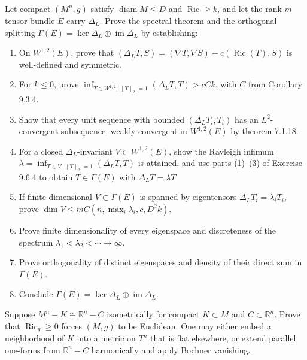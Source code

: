 \begin{remark}
  \label{rem:pet-ch9-exercise-9-6-5}
  Let compact $(M^n,g)$ satisfy $\operatorname{diam}M\le D$ and
  $\operatorname{Ric}\ge k$, and let the rank-$m$ tensor bundle $E$ carry
  $\Delta_L$.  Prove the spectral theorem and the orthogonal splitting
  $\Gamma(E)=\ker\Delta_L\oplus\operatorname{im}\Delta_L$ by establishing:
  \begin{enumerate}
    \item[(1)] On $W^{1,2}(E)$, prove that
      $(\Delta_LT,S)=(\nabla T,\nabla S)+c(\operatorname{Ric}(T),S)$ is
      well-defined and symmetric.
    \item[(2)] For $k\le0$, prove
      $\inf_{T\in W^{1,2},\|T\|_2=1}(\Delta_LT,T)>cCk$, with $C$ from
      Corollary 9.3.4.
    \item[(3)] Show that every unit sequence with bounded
      $(\Delta_LT_i,T_i)$ has an $L^2$-convergent subsequence, weakly convergent
      in $W^{1,2}(E)$ by theorem 7.1.18.
    \item[(4)] For a closed $\Delta_L$-invariant
      $V\subset W^{1,2}(E)$, show the Rayleigh infimum
      $\lambda=\inf_{T\in V,\|T\|_2=1}(\Delta_LT,T)$ is attained, and use
      parts (1)--(3) of Exercise 9.6.4 to obtain
      $T\in\Gamma(E)$ with $\Delta_LT=\lambda T$.
    \item[(5)] If finite-dimensional $V\subset\Gamma(E)$ is spanned by
      eigentensors $\Delta_LT_i=\lambda_iT_i$, prove
      $\dim V\le mC(n,\max_i\lambda_i,c,D^2k)$.
    \item[(6)] Prove finite dimensionality of every eigenspace and discreteness
      of the spectrum $\lambda_1<\lambda_2<\cdots\to\infty$.
    \item[(7)] Prove orthogonality of distinct eigenspaces and density of their
      direct sum in $\Gamma(E)$.
    \item[(8)] Conclude $\Gamma(E)=\ker\Delta_L\oplus\operatorname{im}\Delta_L$.
  \end{enumerate}
\end{remark}

\begin{remark}
  \label{rem:pet-ch9-exercise-9-6-6}
  Suppose $M^n-K\cong\mathbb R^n-C$ isometrically for compact
  $K\subset M$ and $C\subset\mathbb R^n$.  Prove that
  $\operatorname{Ric}_g\ge0$ forces $(M,g)$ to be Euclidean.  One may either
  embed a neighborhood of $K$ into a metric on $T^n$ that is flat elsewhere,
  or extend parallel one-forms from $\mathbb R^n-C$ harmonically and apply
  Bochner vanishing.
\end{remark}

